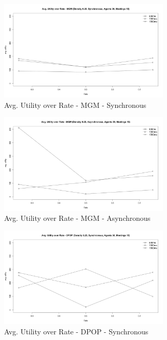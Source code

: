 \begin{figure}[H]
\centering
  \includegraphics[width=310px]{graphics/experiments/dynamic/d_4.png}
  \caption{Avg. Utility over Rate - MGM - Synchronous}
  \label{fig:d_4}
\end{figure}
\begin{figure}[H]
\centering
  \includegraphics[width=310px]{graphics/experiments/dynamic/d_5.png}
  \caption{Avg. Utility over Rate - MGM - Asynchronous}
  \label{fig:d_5}
\end{figure}
\begin{figure}[H]
\centering
  \includegraphics[width=310px]{graphics/experiments/dynamic/d_6.png}
  \caption{Avg. Utility over Rate - DPOP - Synchronous}
  \label{fig:d_6}
\end{figure}


